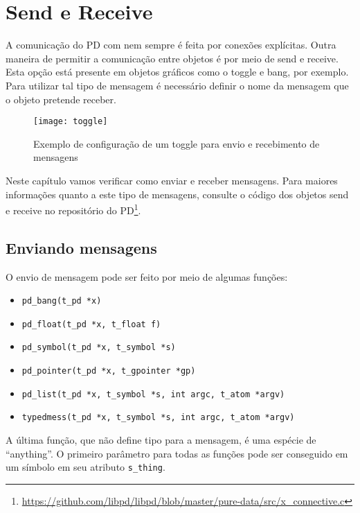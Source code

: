 \chapter{Send e Receive}

A comunicação do PD com \externals nem sempre é feita por conexões explícitas.
Outra maneira de permitir a comunicação entre objetos é por meio de send e
receive.
Esta opção está presente em objetos gráficos como o toggle e bang, por exemplo.
Para utilizar tal tipo de mensagem é necessário definir o nome da mensagem que
o objeto pretende receber.

\begin{figure}[h!]
\centering
\texttt{[image: toggle]}
\caption{Exemplo de configuração de um toggle para envio e recebimento de mensagens}
\end{figure}

Neste capítulo vamos verificar como enviar e receber mensagens.
Para maiores informações quanto a este tipo de mensagens, consulte o código dos
objetos send e receive no repositório do PD\footnote{
\url{https://github.com/libpd/libpd/blob/master/pure-data/src/x_connective.c}
}.

\section{Enviando mensagens}

O envio de mensagem pode ser feito por meio de algumas funções:

\begin{itemize}
\item \texttt{pd\_bang(t\_pd *x)}
\item \texttt{pd\_float(t\_pd *x, t\_float f)}
\item \texttt{pd\_symbol(t\_pd *x, t\_symbol *s)}
\item \texttt{pd\_pointer(t\_pd *x, t\_gpointer *gp)}
\item \texttt{pd\_list(t\_pd *x, t\_symbol *s, int argc, t\_atom *argv)}
\item \texttt{typedmess(t\_pd *x, t\_symbol *s, int argc, t\_atom *argv)}
\end{itemize}

A última função, que não define tipo para a mensagem, é uma espécie de ``anything''.
O primeiro parâmetro para todas as funções pode ser conseguido em um símbolo
em seu atributo \texttt{s\_thing}.

